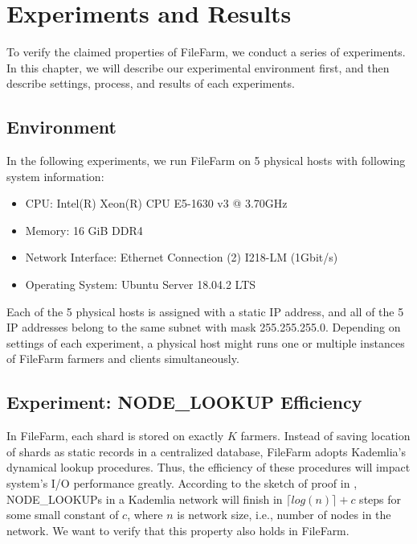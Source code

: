 \chapter{Experiments and Results}
\label{c:experiments_and_results}

To verify the claimed properties of FileFarm, we conduct a series of experiments. In this chapter, we will describe our experimental environment first, and then describe settings, process, and results of each experiments.

\section{Environment}
\label{s:expenvironment}

In the following experiments, we run FileFarm on 5 physical hosts with following system information:

\begin{itemize}
    \item CPU: Intel(R) Xeon(R) CPU E5-1630 v3 @ 3.70GHz
    \item Memory: 16 GiB DDR4
    \item Network Interface: Ethernet Connection (2) I218-LM (1Gbit/s)
    \item Operating System: Ubuntu Server 18.04.2 LTS
\end{itemize}

 \noindent Each of the 5 physical hosts is assigned with a static IP address, and all of the 5 IP addresses belong to the same subnet with mask 255.255.255.0. Depending on settings of each experiment, a physical host might runs one or multiple instances of FileFarm farmers and clients simultaneously.

\section{Experiment: NODE\_LOOKUP Efficiency}
\label{s:expnodelookupefficiency}

In FileFarm, each shard is stored on exactly $K$ farmers. Instead of saving location of shards as static records in a centralized database, FileFarm adopts Kademlia's dynamical lookup procedures. Thus, the efficiency of these procedures will impact system's I/O performance greatly. According to the sketch of proof in \cite{maymounkov2002kademlia}, NODE\_LOOKUPs in a Kademlia network will finish in $\lceil log(n) \rceil + c$ steps for some small constant of $c$, where $n$ is network size, i.e., number of nodes in the network. We want to verify that this property also holds in FileFarm.

